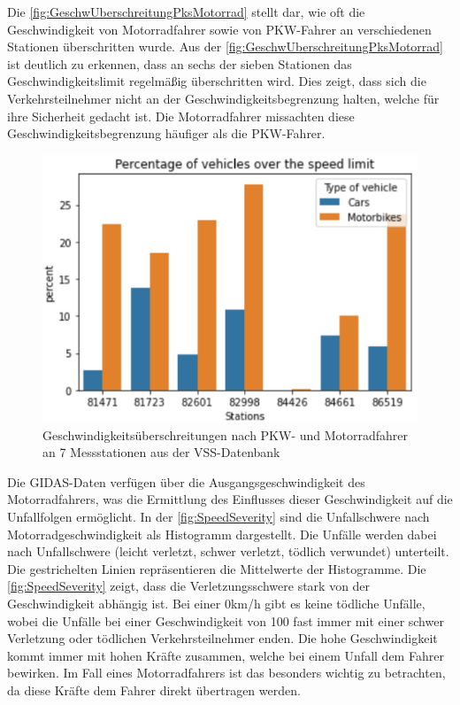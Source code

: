 Die \autoref{fig:GeschwUberschreitungPksMotorrad} stellt dar, wie oft die Geschwindigkeit von Motorradfahrer sowie von PKW-Fahrer an verschiedenen Stationen überschritten wurde. Aus der \autoref{fig:GeschwUberschreitungPksMotorrad} ist deutlich zu erkennen, dass an sechs der sieben Stationen das Geschwindigkeitslimit regelmäßig überschritten wird.
Dies zeigt, dass sich die Verkehrsteilnehmer nicht an der Geschwindigkeitsbegrenzung halten, welche für ihre Sicherheit gedacht ist. Die Motorradfahrer missachten diese Geschwindigkeitsbegrenzung häufiger als die PKW-Fahrer. \cite{Maire2020}


\begin{figure}[H]
	\centering
	\includegraphics[width=\linewidth]{Bilder/GeschwUberschreitungPksMotorrad.png}
	\caption{Geschwindigkeitsüberschreitungen nach PKW- und Motorradfahrer an 7 Messstationen aus der VSS-Datenbank \cite{Maire2020}}
	\label{fig:GeschwUberschreitungPksMotorrad}
\end{figure}
Die GIDAS-Daten verfügen über die Ausgangsgeschwindigkeit des Motorradfahrers, was die Ermittlung des Einflusses dieser Geschwindigkeit auf die Unfallfolgen ermöglicht. In der \autoref{fig:SpeedSeverity} sind die Unfallschwere nach Motorradgeschwindigkeit als Histogramm dargestellt. Die Unfälle werden dabei nach Unfallschwere (leicht verletzt, schwer verletzt, tödlich verwundet) unterteilt. Die gestrichelten Linien repräsentieren die Mittelwerte der Histogramme.
Die \autoref{fig:SpeedSeverity} zeigt, dass die Verletzungsschwere stark von der Geschwindigkeit abhängig ist. Bei einer $0$km/h gibt es keine tödliche Unfälle, wobei die Unfälle bei einer Geschwindigkeit von 100 fast immer mit einer schwer Verletzung oder tödlichen Verkehrsteilnehmer enden. Die hohe Geschwindigkeit kommt immer mit hohen Kräfte zusammen, welche bei einem Unfall dem Fahrer bewirken. Im Fall eines Motorradfahrers ist das besonders wichtig zu betrachten, da diese Kräfte dem Fahrer direkt übertragen werden. \cite{Maire2020}


